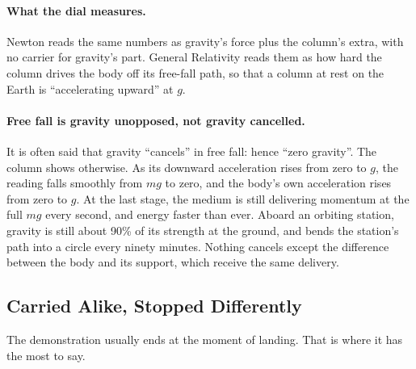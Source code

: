 \documentclass[11pt,a4paper]{article}
\begin{document}
\paragraph{What the dial measures.}  Newton reads the same numbers as gravity's force plus the column's extra, with no carrier for gravity's part. General Relativity reads them as how hard the column drives the body off its free-fall path, so that a column at rest on the Earth is ``accelerating upward'' at $g$. 

\paragraph{Free fall is gravity unopposed, not gravity cancelled.} It is often said that gravity ``cancels'' in free fall: hence ``zero gravity''. The column shows otherwise. As its downward acceleration rises from zero to $g$, the reading falls smoothly from $mg$ to zero, and the body's own acceleration rises from zero to $g$. At the last stage, the medium is still delivering momentum at the full $mg$ every second, and energy faster than ever. Aboard an orbiting station, gravity is still about 90\% of its strength at the ground, and bends the station's path into a circle every ninety minutes. Nothing cancels except the difference between the body and its support, which receive the same delivery. 

\subsection*{Carried Alike, Stopped Differently}

The demonstration usually ends at the moment of landing. That is where it has the most to say.
\end{document}
